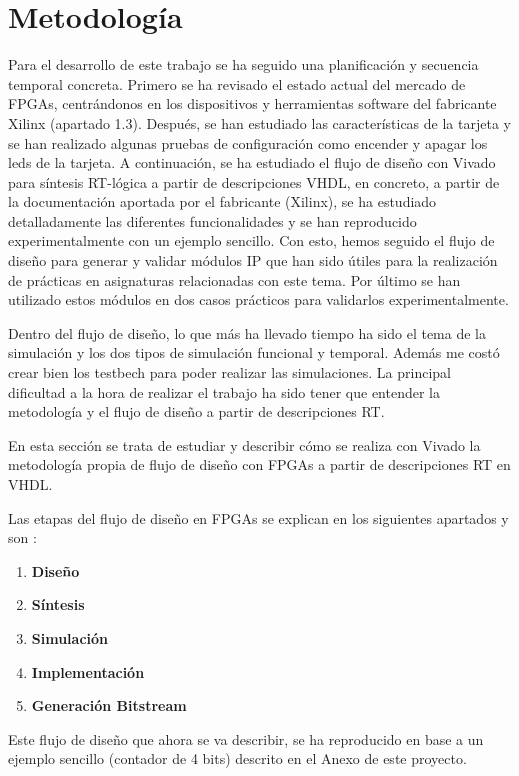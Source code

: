 \section{Metodología}

Para el desarrollo de este trabajo se ha seguido una planificación y secuencia temporal concreta. Primero se ha revisado el estado actual 
del mercado de FPGAs, centrándonos en los dispositivos y herramientas software del fabricante Xilinx (apartado 1.3). Después, se han estudiado las 
características de la tarjeta y se han realizado algunas pruebas de configuración como encender y apagar los leds de la tarjeta. A continuación, 
se ha estudiado el flujo de diseño con Vivado para síntesis RT-lógica a partir de descripciones VHDL, en concreto, a partir de la 
documentación aportada por el fabricante (Xilinx), se ha estudiado detalladamente las diferentes funcionalidades y se han reproducido 
experimentalmente con un ejemplo sencillo. Con esto, hemos seguido el flujo de diseño para generar y validar módulos IP que han sido 
útiles para la realización de prácticas en asignaturas relacionadas con este tema. Por último se han utilizado estos módulos en dos casos 
prácticos para validarlos experimentalmente.

Dentro del flujo de diseño, lo que más ha llevado tiempo ha sido el tema de la simulación y los dos tipos de simulación funcional y temporal. Además 
me costó crear bien los testbech para poder realizar las simulaciones. La principal dificultad a la hora de realizar el trabajo ha sido tener que entender 
la metodología y el flujo de diseño a partir de descripciones RT.

En esta sección se trata de estudiar y describir cómo se realiza con Vivado la metodología propia de flujo de diseño con FPGAs a partir de
descripciones RT en VHDL.

Las etapas del flujo de diseño en FPGAs se explican en los siguientes apartados y son \cite{smith2010fpgas}:

\begin{enumerate}
    \item \textbf{Diseño}
    \item \textbf{Síntesis}
    \item \textbf{Simulación}
    \item \textbf{Implementación}
    \item \textbf{Generación Bitstream}
\end{enumerate}

Este flujo de diseño que ahora se va describir, se ha reproducido en base a un ejemplo sencillo (contador de 4 bits) descrito en el Anexo de este proyecto.

